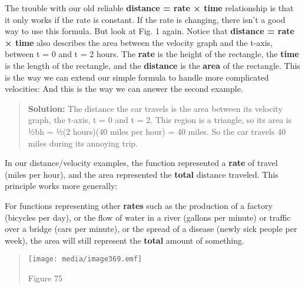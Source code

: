 The trouble with our old reliable \textbf{distance = rate × time}
relationship is that it only works if the rate is constant. If the rate
is changing, there isn't a good way to use this formula. But look at
Fig. 1 again. Notice that \textbf{distance = rate × time} also describes
the area between the velocity graph and the t-axis, between t = 0 and t
= 2 hours. The \textbf{rate} is the height of the rectangle, the
\textbf{time} is the length of the rectangle, and the \textbf{distance}
is the \textbf{area} of the rectangle. This is the way we can extend our
simple formula to handle more complicated velocities: And this is the
way we can answer the second example.

\begin{quote}
\textbf{Solution:} The distance the car travels is the area between its
velocity graph, the t-axis, t = 0 and t = 2. This region is a triangle,
so its area is ½bh = ½(2 hours)(40 miles per hour) = 40 miles. So the
car travels 40 miles during its annoying trip.
\end{quote}

In our distance/velocity examples, the function represented a
\textbf{rate} of travel (miles per hour), and the area represented the
\textbf{total} distance traveled. This principle works more generally:

For functions representing other \textbf{rates} such as the production
of a factory (bicycles per day), or the flow of water in a river
(gallons per minute) or traffic over a bridge (cars per minute), or the
spread of a disease (newly sick people per week), the area will still
represent the \textbf{total} amount of something.

\begin{quote}
\texttt{[image: media/image369.emf]}

Figure 75
\end{quote}

\textbf{\\
}

